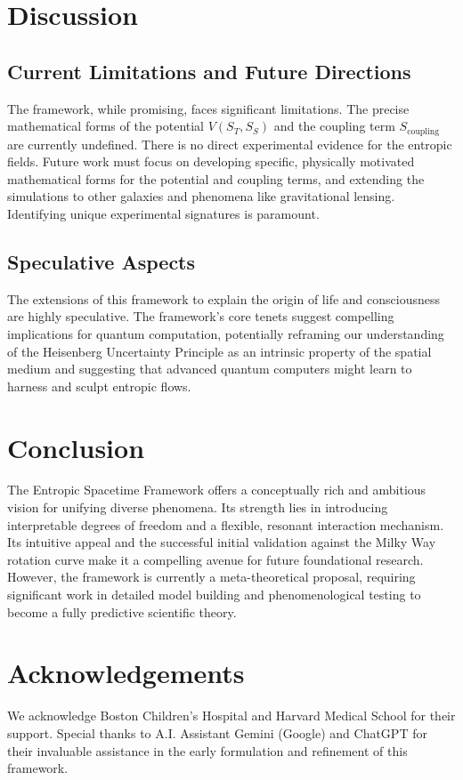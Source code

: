 \documentclass[11pt,a4paper]{article}
\newcommand{\ST}{S_T}
\newcommand{\SSp}{S_S}
\newcommand{\Scoupling}{S_{\text{coupling}}}
\begin{document}
\section{Discussion}
\subsection{Current Limitations and Future Directions}
The framework, while promising, faces significant limitations. The precise mathematical forms of the potential $V(\ST, \SSp)$ and the coupling term $\Scoupling$ are currently undefined. There is no direct experimental evidence for the entropic fields. Future work must focus on developing specific, physically motivated mathematical forms for the potential and coupling terms, and extending the simulations to other galaxies and phenomena like gravitational lensing. Identifying unique experimental signatures is paramount.

\subsection{Speculative Aspects}
The extensions of this framework to explain the origin of life and consciousness are highly speculative. The framework's core tenets suggest compelling implications for quantum computation, potentially reframing our understanding of the Heisenberg Uncertainty Principle as an intrinsic property of the spatial medium and suggesting that advanced quantum computers might learn to harness and sculpt entropic flows.

\section{Conclusion}
The Entropic Spacetime Framework offers a conceptually rich and ambitious vision for unifying diverse phenomena. Its strength lies in introducing interpretable degrees of freedom and a flexible, resonant interaction mechanism. Its intuitive appeal and the successful initial validation against the Milky Way rotation curve make it a compelling avenue for future foundational research. However, the framework is currently a meta-theoretical proposal, requiring significant work in detailed model building and phenomenological testing to become a fully predictive scientific theory.

\section*{Acknowledgements}
We acknowledge Boston Children's Hospital and Harvard Medical School for their support. Special thanks to A.I. Assistant Gemini (Google) and ChatGPT for their invaluable assistance in the early formulation and refinement of this framework.
\end{document}
